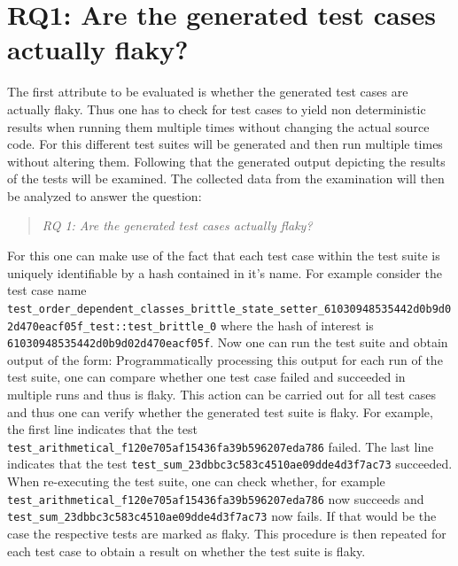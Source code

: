 \documentclass[
fancyheadings, %
%
%
]{stsreprt}
\begin{document}
\section{RQ1: Are the generated test cases actually flaky?}
The first attribute to be evaluated is whether the generated test cases are actually flaky. 
Thus one has to check for test cases to yield non deterministic results when running them multiple times without changing the actual source code. 
For this different test suites will be generated and then run multiple times without altering them. 
Following that the generated output depicting the results of the tests will be examined.
The collected data from the examination will then be analyzed to answer the question: 
\begin{quote}\emph{RQ 1: Are the generated test cases actually flaky?}\end{quote}
For this one can make use of the fact that each test case within the test suite is uniquely identifiable by a hash contained in it's name. 
For example consider the test case name \lstinline{test_order_dependent_classes_brittle_state_setter_61030948535442d0b9d02d470eacf05f_test::test_brittle_0} where the hash of interest is \lstinline{61030948535442d0b9d02d470eacf05f}.
Now one can run the test suite and obtain output of the form:
{\small }
Programmatically processing this output for each run of the test suite, one can compare whether one test case failed and succeeded in multiple runs and thus is flaky. This action can be carried out for all test cases and thus one can verify whether the generated test suite is flaky.
For example, the first line indicates that the test \lstinline{test_arithmetical_f120e705af15436fa39b596207eda786} failed. 
The last line indicates that the test \lstinline{test_sum_23dbbc3c583c4510ae09dde4d3f7ac73} succeeded.
When re-executing the test suite, one can check whether, for example \lstinline{test_arithmetical_f120e705af15436fa39b596207eda786} now succeeds and \lstinline{test_sum_23dbbc3c583c4510ae09dde4d3f7ac73} now fails. 
If that would be the case the respective tests are marked as flaky. 
This procedure is then repeated for each test case to obtain a result on whether the test suite is flaky.
\end{document}
